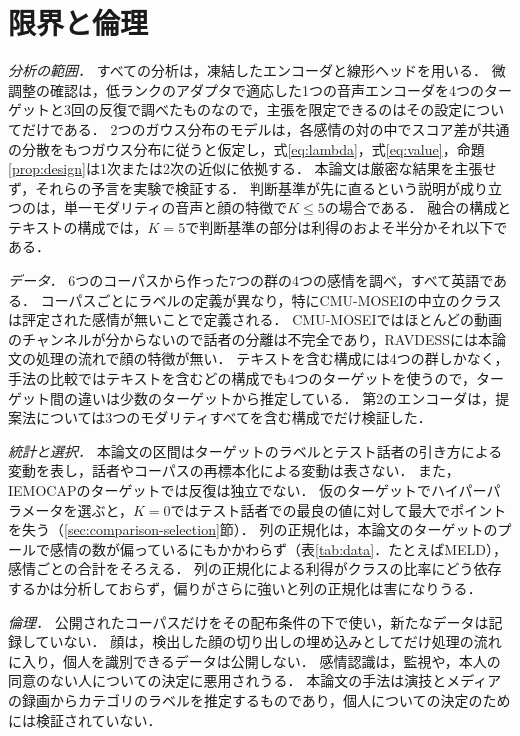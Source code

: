\section{限界と倫理}
\label{sec:limitations-ethics}

\emph{分析の範囲．}
すべての分析は，凍結したエンコーダと線形ヘッドを用いる．
微調整の確認は，低ランクのアダプタで適応した1つの音声エンコーダを4つのターゲットと3回の反復で調べたものなので，主張を限定できるのはその設定についてだけである．
2つのガウス分布のモデルは，各感情の対の中でスコア差が共通の分散をもつガウス分布に従うと仮定し，式\eqref{eq:lambda}，式\eqref{eq:value}，命題\ref{prop:design}は1次または2次の近似に依拠する．
本論文は厳密な結果を主張せず，それらの予言を実験で検証する．
判断基準が先に直るという説明が成り立つのは，単一モダリティの音声と顔の特徴で$K \le 5$の場合である．
融合の構成とテキストの構成では，$K=5$で判断基準の部分は利得のおよそ半分かそれ以下である．

\emph{データ．}
6つのコーパスから作った7つの群の4つの感情を調べ，すべて英語である．
コーパスごとにラベルの定義が異なり，特にCMU-MOSEIの中立のクラスは評定された感情が無いことで定義される．
CMU-MOSEIではほとんどの動画のチャンネルが分からないので話者の分離は不完全であり，RAVDESSには本論文の処理の流れで顔の特徴が無い．
テキストを含む構成には4つの群しかなく，手法の比較ではテキストを含むどの構成でも4つのターゲットを使うので，ターゲット間の違いは少数のターゲットから推定している．
第2のエンコーダは，提案法については3つのモダリティすべてを含む構成でだけ検証した．

\emph{統計と選択．}
本論文の区間はターゲットのラベルとテスト話者の引き方による変動を表し，話者やコーパスの再標本化による変動は表さない．
また，IEMOCAPのターゲットでは反復は独立でない．
仮のターゲットでハイパーパラメータを選ぶと，$K=0$ではテスト話者での最良の値に対して最大でポイントを失う（\ref{sec:comparison-selection}節）．
列の正規化は，本論文のターゲットのプールで感情の数が偏っているにもかかわらず（表\ref{tab:data}．たとえばMELD），感情ごとの合計をそろえる．
列の正規化による利得がクラスの比率にどう依存するかは分析しておらず，偏りがさらに強いと列の正規化は害になりうる\cite{veilleux2021realistic}．

\emph{倫理．}
公開されたコーパスだけをその配布条件の下で使い，新たなデータは記録していない．
顔は，検出した顔の切り出しの埋め込みとしてだけ処理の流れに入り，個人を識別できるデータは公開しない．
感情認識は，監視や，本人の同意のない人についての決定に悪用されうる．
本論文の手法は演技とメディアの録画からカテゴリのラベルを推定するものであり，個人についての決定のためには検証されていない．
